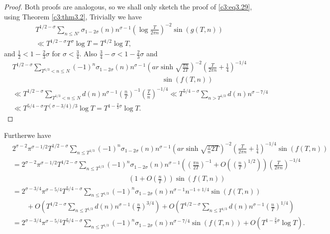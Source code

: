 \begin{proof}
  Both proofs are analogous, so we shall only sketch the proof of
  \eqref{c3:eq3.29}, using Theorem \ref{c3:thm3.2}, Trivially we have
  \begin{multline*}
    T^{1/2-\sigma} \sum_{n \leq N'} \sigma_{1-2 \sigma}(n)
    n^{\sigma-1} \left(\log \frac{T}{2 \pi n} \right)^{-2} \sin (g(T,
    n))\\
    \ll T^{1/2-\sigma}T^{\sigma} \log T = T^{1/2} \log T,
  \end{multline*}
and $\frac{1}{2} < 1 - \frac{2}{3} \sigma$ for $\sigma <
\frac{3}{4}$. Also $\frac{3}{4}- \sigma < 1- \frac{2}{3} \sigma$ and 
\begin{align*}
  & T^{1/2-\sigma} \sum_{T^{1/3} < n \leq N} (-1)^n \sigma_{1-2
    \sigma}(n) n^{\sigma-1} \left(ar \sinh \sqrt{\frac{\pi
      n}{2T}}\right)^{-2} \left(\frac{T}{2 \pi n}+ \frac{1}{4}
  \right)^{-1/4}\\
  & \hspace{9cm}\sin (f(T, n))\\
  & \ll T^{1/2 -\sigma} \sum_{T^{1/3}< n \leq N} d(n) n^{\sigma-1}
  \left(\frac{n}{T} \right)^{-1} \left(\frac{T}{n} \right)^{-1/4} \ll
  T^{5/4-\sigma} \sum_{n > T^{1/3}} d(n) n^{\sigma- 7/4}\\
  & \ll T^{5/4-\sigma}T^{(\sigma- 3/4)/3} \log T = T^{1-
    \frac{2}{3}\sigma} \log T.
\end{align*}
\end{proof}

Further\pageoriginale we have
{\fontsize{8}{10}\selectfont
\begin{align*}
  & 2^{\sigma-2}\pi^{\sigma-1/2}T^{1/2-\sigma} \sum_{n \leq T^{1/3}}
  (-1)^n \sigma_{1-2\sigma}(n) n^{\sigma-1} \left(ar \sinh
  \sqrt{\frac{\pi}{n}{2T}}\right)^{-2} \left(\frac{T}{2 \pi n}+
  \frac{1}{4}\right)^{-1/4} \sin (f(T, n))\\
  & =2^{\sigma-2} \pi^{\sigma -1/2}T^{1/2-\sigma} \sum_{n \leq T^{1/3}}
  (-1)^n \sigma_{1- 2 \sigma}(n) n^{\sigma-1} \left( \left( \frac{\pi
    n}{2T}\right)^{-1} + O \left( \left( \frac{n}{T}\right)^{1/2}
  \right)\right) \left(\frac{T}{2 \pi n} \right)^{-1/4}\\ 
  & \hspace{7cm}\left(1+ O
  \left(\frac{n}{T} \right) \right) \sin (f (T, n))\\
  & = 2^{\sigma-3/4} \pi^{\sigma-5/4} T^{5/4-\sigma} \sum_{n \leq
    T^{1/3}}(-1)^n \sigma_{1-2\sigma}(n) n^{\sigma-1}n^{-1 + 1/4} \sin
  (f(T, n))\\
  &\qquad + O\left( T^{1/2-\sigma} \sum_{n \leq T^{1/3}} d(n) n^{\sigma-1}
  \left(\frac{n}{T} \right)^{3/4} \right) + O \left(T^{1/2 -\sigma}
  \sum_{n \leq T^{1/3}} d(n) n^{\sigma-1} \left(\frac{n}{T}
  \right)^{1/4}\right)\\
  & = 2^{\sigma-3/4} \pi^{\sigma-5/4}T^{5/4-\sigma} \sum_{n \leq
    T^{1/3}} (-1)^n \sigma_{1-2 \sigma} (n) n^{\sigma-7/4} \sin (f(T,
  n)) + O \left(T^{1- \frac{2}{3}\sigma} \log T \right).
\end{align*}}

